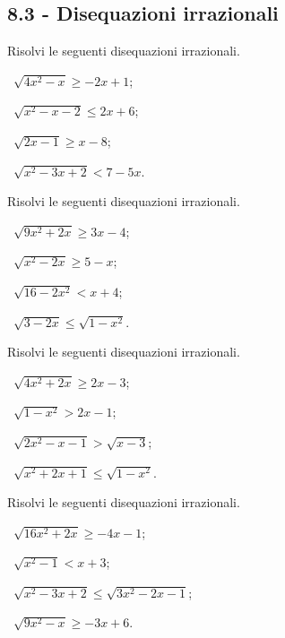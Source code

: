 \subsection*{8.3 - Disequazioni irrazionali}

\begin{esercizio}[\Ast]
 \label{ese:8.19}
Risolvi le seguenti disequazioni irrazionali.
\begin{multicols}{2}
 \begin{enumeratea}
 \item~$\sqrt{4x^2-x}\ge -2x+1$;
 \item~$\sqrt{x^2-x-2}\le 2x+6$;
 \item~$\sqrt{2x-1}\ge x-8$;
 \item~$\sqrt{x^2-3x+2}<7-5x$.
 \end{enumeratea}
 \end{multicols}
\end{esercizio}

\begin{esercizio}[\Ast]
 \label{ese:8.20}
Risolvi le seguenti disequazioni irrazionali.
\begin{multicols}{2}
 \begin{enumeratea}
 \item~$\sqrt{9x^2+2x}\ge 3x-4$;
 \item~$\sqrt{x^2-2x}\ge 5-x$;
 \item~$\sqrt{16-2x^2}<x+4$;
 \item~$\sqrt{3-2x}\le \sqrt{1-x^2}$.
 \end{enumeratea}
 \end{multicols}
\end{esercizio}

\begin{esercizio}[\Ast]
 \label{ese:8.21}
Risolvi le seguenti disequazioni irrazionali.
\begin{multicols}{2}
 \begin{enumeratea}
 \item~$\sqrt{4x^2+2x}\ge 2x-3$;
 \item~$\sqrt{1-x^2}>2x-1$;
 \item~$\sqrt{2x^2-x-1}>\sqrt{x-3}$;
 \item~$\sqrt{x^2+2x+1}\le \sqrt{1-x^2}$.
 \end{enumeratea}
 \end{multicols}
\end{esercizio}

\begin{esercizio}[\Ast]
 \label{ese:8.22}
Risolvi le seguenti disequazioni irrazionali.
\begin{multicols}{2}
 \begin{enumeratea}
 \item~$\sqrt{16x^2+2x}\ge -4x-1$;
 \item~$\sqrt{x^2-1}<x+3$;
 \item~$\sqrt{x^2-3x+2}\le \sqrt{3x^2-2x-1}$;
 \item~$\sqrt{9x^2-x}\ge -3x+6$.
 \end{enumeratea}
 \end{multicols}
\end{esercizio}


